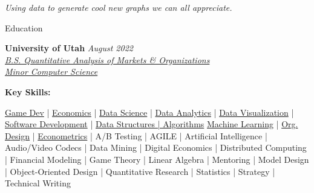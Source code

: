 \documentclass{resume/resume}
\begin{document}

\begin{center}
 \vspace{-1em}
 {\em
    Using data to generate cool new graphs we can all appreciate.
 }
 \vspace{-10pt}
\end{center}


\begin{rSection}{Education}

{\bf University of Utah} \hfill {\em August 2022}
\vspace{2pt}
\emph{
    \\ \href{https://eccles.utah.edu/programs/undergraduate/academics/majors/qamo/}{B.S. Quantitative Analysis of Markets \& Organizations 
}
    \\ \href{https://github.com/search?o=desc&q=user\%3ASpelkington&s=updated&type=Repositories}{Minor Computer Science}
}


{\bf Key Skills:}
\vspace{-1.83em}

\begin{adjustwidth}{6em}{0pt}
    \href{https://spelkington.github.io/Because-I-Cannot-Draw/}{Game Dev} |  %
    \href{https://www.youtube.com/watch?v=lMFQp3wN-cg}{Economics} |  %
    \href{https://github.com/Spelkington/mlearning}{Data Science} |  %
    \href{https://github.com/UtahTriangle/Laws/blob/main/Proposals/NationalsHelp/figures/distances.pdf}{Data Analytics} |  %
    \href{https://spelkington.github.io/assets/utah_office_update.pdf}{Data Visualization} |  %
    \href{https://github.com/spelkington}{Software Development} |
    \href{https://www.youtube.com/watch?v=lMFQp3wN-cg}{Data Structures | Algorithms}
    \href{https://github.com/Spelkington/mlearning}{Machine Learning} |  %
    \href{https://spelkington.github.io/assets/utah_office_update.pdf}{Org. Design} |  %
    \href{https://github.com/Spelkington/econometrics}{Econometrics} |  %
    A/B Testing | 
    AGILE | 
    Artificial Intelligence | 
    Audio/Video Codecs | 
    Data Mining | 
    Digital Economics | 
    Distributed Computing |
    Financial Modeling |
    Game Theory | 
    Linear Algebra | 
    Mentoring |
    Model Design | 
    Object-Oriented Design |
    Quantitative Research |
    Statistics |
    Strategy |
    Technical Writing
    

\end{adjustwidth}
\end{rSection}
\end{document}

